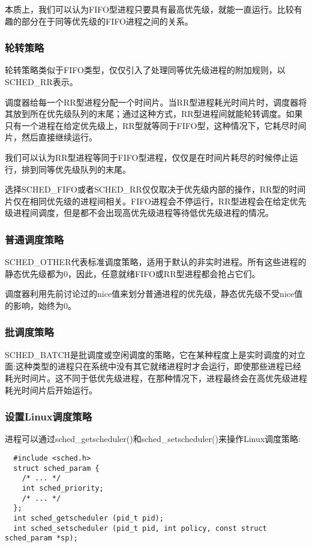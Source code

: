   本质上，我们可以认为FIFO型进程只要具有最高优先级，就能一直运行。比较有趣的部分在于同等优先级的FIFO进程之间的关系。

\subsubsection{轮转策略}

  轮转策略类似于FIFO类型，仅仅引入了处理同等优先级进程的附加规则，以SCHED\_RR表示。

  调度器给每一个RR型进程分配一个时间片。当RR型进程耗光时间片时，调度器将其放到所在优先级队列的末尾；通过这种方式，RR型进程间就能轮转调度。如果只有一个进程在给定优先级上，RR型就等同于FIFO型，这种情况下，它耗尽时间片，然后直接继续运行。

  我们可以认为RR型进程等同于FIFO型进程，仅仅是在时间片耗尽的时候停止运行，排到同等优先级队列的末尾。

  选择SCHED\_FIFO或者SCHED\_RR仅仅取决于优先级内部的操作，RR型的时间片仅在相同优先级的进程间相关。FIFO进程会不停运行，RR型进程会在给定优先级进程间调度，但是都不会出现高优先级进程等待低优先级进程的情况。

\subsubsection{普通调度策略}

  SCHED\_OTHER代表标准调度策略，适用于默认的非实时进程。所有这些进程的静态优先级都为0，因此，任意就绪FIFO或RR型进程都会抢占它们。

  调度器利用先前讨论过的nice值来划分普通进程的优先级，静态优先级不受nice值的影响，始终为0。

\subsubsection{批调度策略}

  SCHED\_BATCH是批调度或空闲调度的策略，它在某种程度上是实时调度的对立面:这种类型的进程只在系统中没有其它就绪进程时才会运行，即使那些进程已经耗光时间片。这不同于低优先级进程，在那种情况下，进程最终会在高优先级进程耗光时间片后开始运行。

\subsubsection{设置Linux调度策略}

  进程可以通过sched\_getscheduler()和sched\_setscheduler()来操作Linux调度策略:

\begin{lstlisting}
  #include <sched.h>
  struct sched_param {
    /* ... */
    int sched_priority;
    /* ... */
  };
  int sched_getscheduler (pid_t pid);
  int sched_setscheduler (pid_t pid, int policy, const struct sched_param *sp);
\end{lstlisting}

